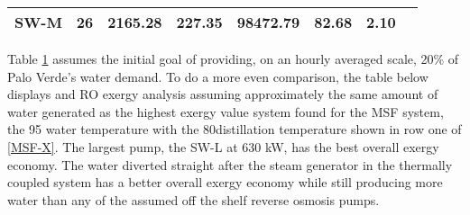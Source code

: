 \begin{table}[h!]
\begin{tabular}{|l|l|l|l|l|l|l|l|}
SW-M                                                                                  & 26                                                                                      & 2165.28                                                                                        & 227.35                                                                             & 98472.79                                                                            & 82.68              & 2.10                                                               \\ \hline
\end{tabular}
\label{RO-X}
\end{table}

Table \ref{RO-X} assumes the initial goal of providing, on an hourly averaged scale, 20\% of Palo Verde's water demand. To do a more even comparison, the table below displays and RO exergy analysis assuming approximately the same amount of water generated as the highest exergy value system found for the MSF system, the 95 \degree water temperature with the 80\degree distillation temperature shown in row one of \ref{MSF-X}. The largest pump, the SW-L at 630 kW, has the best overall exergy economy. The water diverted straight after the steam generator in the thermally coupled system has a better overall exergy economy while still producing more water than any of the assumed off the shelf reverse osmosis pumps. 

